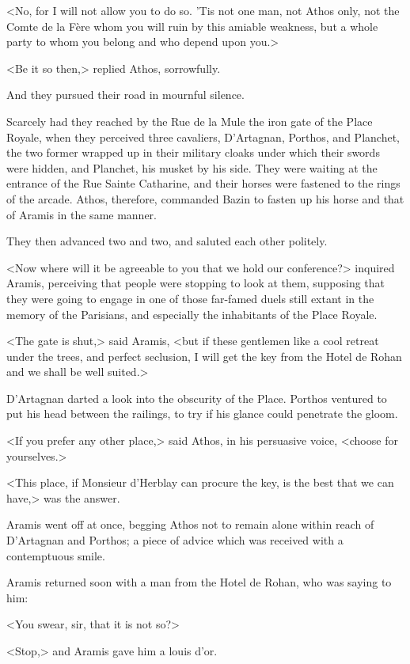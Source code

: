 <No, for I will not allow you to do so. 'Tis not one man, not Athos only, not the Comte de la Fère whom you will ruin by this amiable weakness, but a whole party to whom you belong and who depend upon you.>

<Be it so then,> replied Athos, sorrowfully.

And they pursued their road in mournful silence.

Scarcely had they reached by the Rue de la Mule the iron gate of the Place Royale, when they perceived three cavaliers, D'Artagnan, Porthos, and Planchet, the two former wrapped up in their military cloaks under which their swords were hidden, and Planchet, his musket by his side. They were waiting at the entrance of the Rue Sainte Catharine, and their horses were fastened to the rings of the arcade. Athos, therefore, commanded Bazin to fasten up his horse and that of Aramis in the same manner.

They then advanced two and two, and saluted each other politely.

<Now where will it be agreeable to you that we hold our conference?> inquired Aramis, perceiving that people were stopping to look at them, supposing that they were going to engage in one of those far-famed duels still extant in the memory of the Parisians, and especially the inhabitants of the Place Royale.

<The gate is shut,> said Aramis, <but if these gentlemen like a cool retreat under the trees, and perfect seclusion, I will get the key from the Hotel de Rohan and we shall be well suited.>

D'Artagnan darted a look into the obscurity of the Place. Porthos ventured to put his head between the railings, to try if his glance could penetrate the gloom.

<If you prefer any other place,> said Athos, in his persuasive voice, <choose for yourselves.>

<This place, if Monsieur d'Herblay can procure the key, is the best that we can have,> was the answer.

Aramis went off at once, begging Athos not to remain alone within reach of D'Artagnan and Porthos; a piece of advice which was received with a contemptuous smile.

Aramis returned soon with a man from the Hotel de Rohan, who was saying to him:

<You swear, sir, that it is not so?>

<Stop,> and Aramis gave him a louis d'or.

